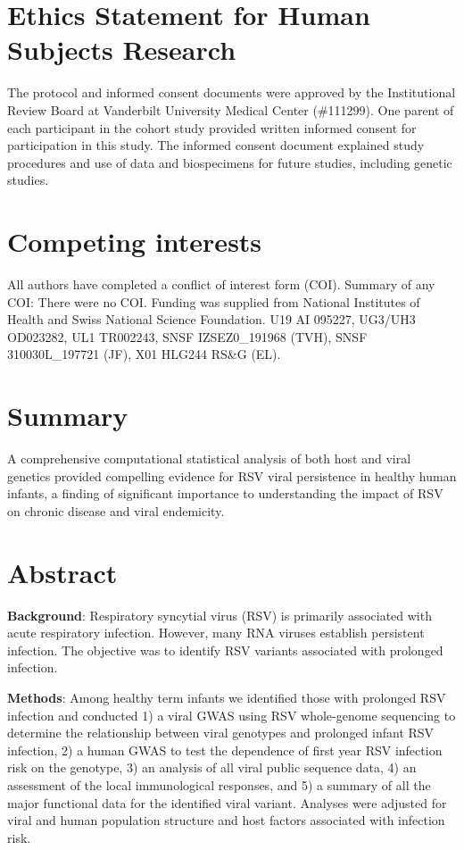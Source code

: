 \documentclass{article} %
\begin{document}
\section*{Ethics Statement for Human Subjects Research}
The protocol and informed consent documents were approved by the Institutional Review Board at Vanderbilt University Medical Center (\#111299). 
One parent of each participant in the cohort study provided written informed consent for participation in this study. 
The informed consent document explained study procedures and use of data and biospecimens for future studies, including genetic studies.


\section*{Competing interests}
All authors have completed a conflict of interest form (COI). 
Summary of any COI: There were no COI. 
Funding was supplied from National Institutes of Health 
and Swiss National Science Foundation.
U19 AI 095227, UG3/UH3 OD023282, UL1 TR002243, SNSF IZSEZ0\_191968   (TVH), SNSF 310030L\_197721 (JF), X01 HLG244 RS\&G (EL).

\section*{Summary}
A comprehensive computational statistical analysis of both host and viral genetics provided compelling evidence for RSV viral persistence in healthy human infants, 
a finding of significant importance to understanding the impact of RSV on chronic disease and viral endemicity. 

\clearpage
\section{Abstract}
\textbf{Background}: 
Respiratory syncytial virus (RSV) is primarily associated with acute respiratory infection. 
However, many RNA viruses establish persistent infection. 
The objective was to identify RSV variants associated with prolonged infection. 

\noindent \textbf{Methods}: 
Among healthy term infants we identified those with prolonged RSV infection and conducted 1) a viral GWAS using RSV whole-genome sequencing to determine the relationship between viral genotypes and prolonged infant RSV infection, 2) a human GWAS to test the dependence of first year RSV infection risk on the genotype, 3) an analysis of all viral public sequence data, 4) an assessment of the local immunological responses, and 5) a summary of all the major functional data for the identified viral variant. Analyses were adjusted for viral and human population structure and host factors associated with infection risk.
\end{document}
